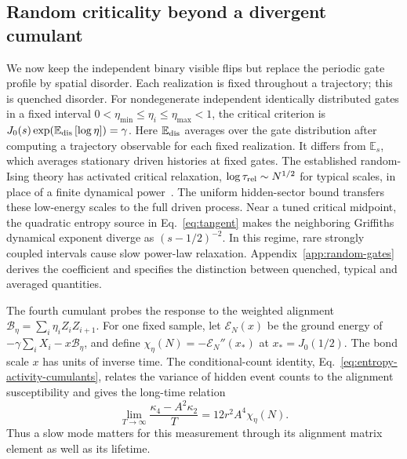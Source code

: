 \documentclass[aps,pre,reprint,amsmath,amssymb,longbibliography,floatfix]{revtex4-2}
\newcommand{\E}{\mathbb E}
\begin{document}
\subsection{Random criticality beyond a divergent cumulant}
\label{sec:random-response}
We now keep the independent binary visible flips but replace the
periodic gate profile by spatial disorder. Each realization is fixed
throughout a trajectory; this is quenched disorder. For nondegenerate
independent identically distributed gates in a fixed interval
$0<\eta_{\min}\leq\eta_i\leq\eta_{\max}<1$, the critical criterion is
$J_0(s)\exp(\E_{\rm dis}\left[\log\eta\right])=\gamma$. Here $\E_{\rm dis}$ averages over the gate distribution after computing
a trajectory observable for each fixed realization. It differs from
$\E_s$, which averages stationary driven histories at fixed gates.
The established random-Ising theory has activated critical relaxation,
$\log\tau_{\rm rel}\sim N^{1/2}$ for typical scales, in place of a
finite dynamical power~\cite{Fisher1995,IgloiRieger1998RandomWalks}.
The uniform hidden-sector bound transfers these low-energy scales to
the full driven process. Near a tuned critical midpoint, the quadratic
entropy source in Eq.~\eqref{eq:tangent} makes the neighboring
Griffiths dynamical exponent diverge as $(s-1/2)^{-2}$. In this regime,
rare strongly coupled intervals cause slow power-law relaxation. Appendix~\ref{app:random-gates} derives the
coefficient and specifies the distinction between quenched, typical
and averaged quantities.

The fourth cumulant  probes the response to the weighted alignment
$\mathcal B_\eta=\sum_i\eta_iZ_iZ_{i+1}$. For one fixed sample, let
$\mathscr E_N(x)$ be the ground energy of
$-\gamma\sum_iX_i-x\mathcal B_\eta$, and define
$\chi_\eta(N)=-\mathscr E_N''(x_*)$ at $x_*=J_0(1/2)$.
The bond scale $x$ has units of inverse time. The conditional-count
identity, Eq.~\eqref{eq:entropy-activity-cumulants},  
relates the variance of hidden event counts to the alignment
susceptibility and gives the long-time relation
\begin{equation}
 \lim_{T\to\infty}\frac{\kappa_4-A^2\kappa_2}{T}
 =12r^2A^4\chi_\eta(N).
 \label{eq:random-cumulant-main}
\end{equation}
Thus a slow mode matters for this measurement through its alignment
matrix element as well as its lifetime.
\end{document}
